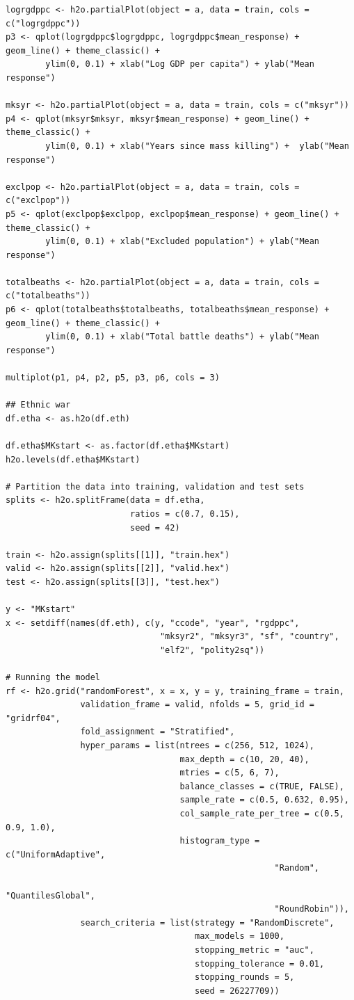 \begin{verbatim}
logrgdppc <- h2o.partialPlot(object = a, data = train, cols = c("logrgdppc"))
p3 <- qplot(logrgdppc$logrgdppc, logrgdppc$mean_response) + geom_line() + theme_classic() +
        ylim(0, 0.1) + xlab("Log GDP per capita") + ylab("Mean response")

mksyr <- h2o.partialPlot(object = a, data = train, cols = c("mksyr"))
p4 <- qplot(mksyr$mksyr, mksyr$mean_response) + geom_line() + theme_classic() + 
        ylim(0, 0.1) + xlab("Years since mass killing") +  ylab("Mean response")

exclpop <- h2o.partialPlot(object = a, data = train, cols = c("exclpop"))
p5 <- qplot(exclpop$exclpop, exclpop$mean_response) + geom_line() + theme_classic() +
        ylim(0, 0.1) + xlab("Excluded population") + ylab("Mean response")

totalbeaths <- h2o.partialPlot(object = a, data = train, cols = c("totalbeaths"))
p6 <- qplot(totalbeaths$totalbeaths, totalbeaths$mean_response) + geom_line() + theme_classic() +
        ylim(0, 0.1) + xlab("Total battle deaths") + ylab("Mean response")

multiplot(p1, p4, p2, p5, p3, p6, cols = 3)

## Ethnic war
df.etha <- as.h2o(df.eth)

df.etha$MKstart <- as.factor(df.etha$MKstart) 
h2o.levels(df.etha$MKstart)

# Partition the data into training, validation and test sets
splits <- h2o.splitFrame(data = df.etha, 
                         ratios = c(0.7, 0.15), 
                         seed = 42) 

train <- h2o.assign(splits[[1]], "train.hex")   
valid <- h2o.assign(splits[[2]], "valid.hex") 
test <- h2o.assign(splits[[3]], "test.hex")

y <- "MKstart"
x <- setdiff(names(df.eth), c(y, "ccode", "year", "rgdppc",
                               "mksyr2", "mksyr3", "sf", "country",
                               "elf2", "polity2sq")) 

# Running the model
rf <- h2o.grid("randomForest", x = x, y = y, training_frame = train, 
               validation_frame = valid, nfolds = 5, grid_id = "gridrf04",
               fold_assignment = "Stratified",
               hyper_params = list(ntrees = c(256, 512, 1024),
                                   max_depth = c(10, 20, 40),
                                   mtries = c(5, 6, 7),
                                   balance_classes = c(TRUE, FALSE),
                                   sample_rate = c(0.5, 0.632, 0.95),
                                   col_sample_rate_per_tree = c(0.5, 0.9, 1.0),
                                   histogram_type = c("UniformAdaptive",
                                                      "Random",
                                                      "QuantilesGlobal",
                                                      "RoundRobin")),
               search_criteria = list(strategy = "RandomDiscrete", 
                                      max_models = 1000, 
                                      stopping_metric = "auc", 
                                      stopping_tolerance = 0.01, 
                                      stopping_rounds = 5, 
                                      seed = 26227709)) 


\end{verbatim}
